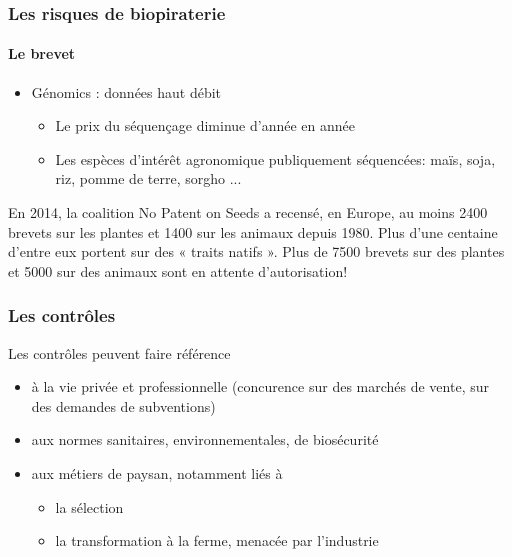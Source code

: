 \begin{frame}
\frametitle{Les risques de biopiraterie}
\framesubtitle{Le brevet}

\begin{itemize}

\item Génomics : données haut débit
	\begin{itemize}
	\item Le prix du séquençage diminue d'année en année
\item Les espèces d'intérêt agronomique publiquement séquencées: maïs, soja, riz, pomme de terre, sorgho ...
	\end{itemize}

\end{itemize}

\vfill

En 2014, la coalition No Patent on Seeds a recensé, en Europe, au moins 2400 brevets sur les plantes et 1400 sur les animaux depuis 1980. 
Plus d'une centaine d'entre eux portent sur des « traits natifs ». 
Plus de 7500 brevets sur des plantes et 5000 sur des animaux sont en attente d'autorisation!

                                                                                                                                                                                                                                                                                                                 
\end{frame}




\begin{frame}
\frametitle{Les contrôles}

Les contrôles peuvent faire référence
\begin{itemize}
\item à la vie privée et professionnelle (concurence sur des marchés de vente, sur des demandes de subventions)
\item aux normes sanitaires, environnementales, de biosécurité
\item aux métiers de paysan, notamment liés à
\begin{itemize}
\item la sélection
\item la transformation à la ferme, menacée par l'industrie %
\end{itemize}
\end{itemize}

\end{frame}
